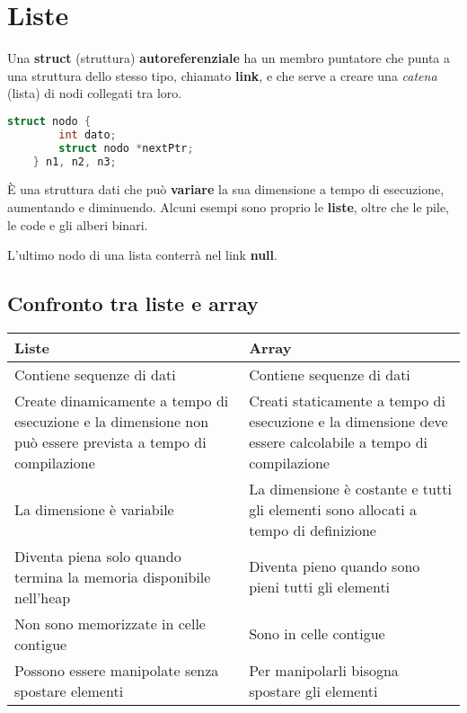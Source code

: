 \newpage
\section{Liste}
Una \textbf{struct} (struttura) \textbf{autoreferenziale} ha un membro puntatore che punta a una struttura dello stesso tipo, chiamato \textbf{link}, e che serve a creare una \emph{catena} (lista) di nodi collegati tra loro.
\begin{lstlisting}[language=C, caption=Esempio di una struct]
	struct nodo {
		int dato;
		struct nodo *nextPtr;
	} n1, n2, n3;
\end{lstlisting}

\begin{definition}
	È una struttura dati che può \textbf{variare} la sua dimensione a tempo di esecuzione, aumentando e diminuendo. Alcuni esempi sono proprio le \textbf{liste}, oltre che le pile, le code e gli alberi binari.
\end{definition}

\begin{note}
	L'ultimo nodo di una lista conterrà nel link \textbf{null}.
\end{note}

\subsection{Confronto tra liste e array}
\begin{table}[!h]
	\centering
	\begin{tabular}{|p{150px}|p{150px}|}
		\hline
		\textbf{Liste} & \textbf{Array} \\
		\hline
		Contiene sequenze di dati & Contiene sequenze di dati \\ 
		\hline
		Create dinamicamente a tempo di esecuzione e la dimensione non può essere prevista a tempo di compilazione & Creati staticamente a tempo di esecuzione e la dimensione deve essere calcolabile a tempo di compilazione \\
		\hline
		La dimensione è variabile &  La dimensione è costante e tutti gli elementi sono allocati a tempo di definizione\\
		\hline
		Diventa piena solo quando termina la memoria disponibile nell'heap & Diventa pieno quando sono pieni tutti gli elementi \\
		\hline
		Non sono memorizzate in celle contigue & Sono in celle contigue \\
		\hline
		Possono essere manipolate senza spostare elementi & Per manipolarli bisogna spostare gli elementi \\
		\hline
	\end{tabular}
\end{table}

